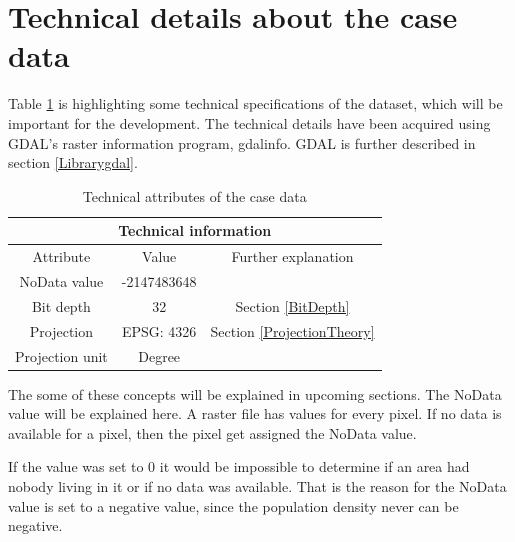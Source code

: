 \section{Technical details about the case data}\label{caseDataTech}

Table \ref{tabTech} is highlighting some technical specifications of the dataset, which will be important for the development. The technical details have been acquired using GDAL's raster information program, gdalinfo. GDAL is further described in section \ref{Librarygdal}.

\begin{table}[h]%
	\centering
\begin{tabular}{|c|c|c|}
	\hline 
	\multicolumn{3}{|c|}{Technical information} \\ 
	\hline 
	Attribute & Value & Further explanation \\ 
	\hline 
	NoData value & -2147483648 &  \\ 
	\hline 
	Bit depth & 32 &  Section \ref{BitDepth}\\ 
	\hline 
	Projection & EPSG: 4326 &  Section \ref{ProjectionTheory}\\ 
	\hline 
	Projection unit & Degree &   \\ 
	\hline 
\end{tabular}
\caption{Technical attributes of the case data}
 \label{tabTech}
\end{table}

The some of these concepts will be explained in upcoming sections. The NoData value will be explained here. A raster file has values for every pixel. If no data is available for a pixel, then the pixel get assigned the NoData value. \citep{ArcMapOnNoData}

If the value was set to 0 it would be impossible to determine if an area had nobody living in it or if no data was available. That is the reason for the NoData value is set to a negative value, since the population density never can be negative.




